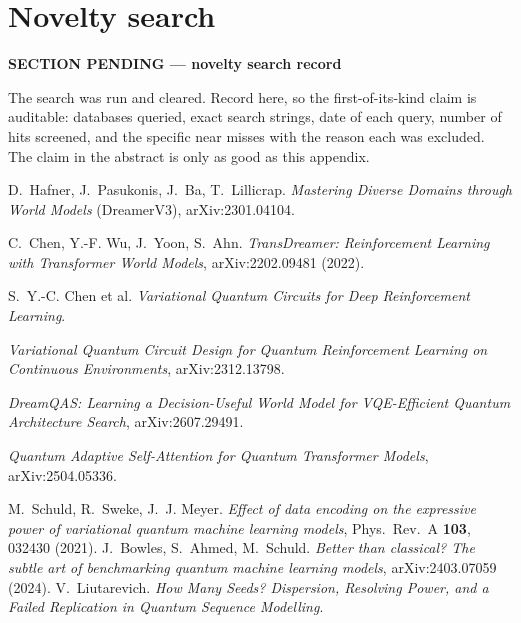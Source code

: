 \documentclass[11pt]{article}
\newif\ifdraft
\newcommand{\pend}[1]{%
  \ifdraft\textcolor{PendFG}{\textbf{[TODO:} \textit{#1}\textbf{]}}\fi}
\newenvironment{pendingbox}[1]
  {\par\vspace{3pt}\noindent
   \begin{lrbox}{\pendbox}\begin{minipage}{0.93\linewidth}\small
   \textcolor{PendFG}{\textbf{SECTION PENDING --- #1}}\par\vspace{3pt}
   \color{PendFG}}
  {\end{minipage}\end{lrbox}%
   \ifdraft\fcolorbox{PendFG}{PendBG}{\usebox{\pendbox}}\fi
   \par\vspace{4pt}}
\begin{document}
\section{Novelty search}\label{app:novelty}
\begin{pendingbox}{novelty search record}
The search was run and cleared. Record here, so the first-of-its-kind
claim is auditable: databases queried, exact search strings, date of
each query, number of hits screened, and the specific near misses with
the reason each was excluded. The claim in the abstract is only as good
as this appendix.
\end{pendingbox}


\begin{thebibliography}{9}
 D.~Hafner, J.~Pasukonis, J.~Ba, T.~Lillicrap.
  \emph{Mastering Diverse Domains through World Models} (DreamerV3),
  arXiv:2301.04104. \pend{confirm venue and year of record}
 C.~Chen, Y.-F. Wu, J.~Yoon, S.~Ahn.
  \emph{TransDreamer: Reinforcement Learning with Transformer World
  Models}, arXiv:2202.09481 (2022). \pend{verify author list}
 S.~Y.-C. Chen et al. \emph{Variational Quantum
  Circuits for Deep Reinforcement Learning}. \pend{full citation}
 \emph{Variational Quantum Circuit Design for
  Quantum Reinforcement Learning on Continuous Environments},
  arXiv:2312.13798. \pend{verify authors}
 \emph{DreamQAS: Learning a Decision-Useful World
  Model for VQE-Efficient Quantum Architecture Search},
  arXiv:2607.29491. \pend{verify authors}
 \emph{Quantum Adaptive Self-Attention for Quantum
  Transformer Models}, arXiv:2504.05336. \pend{verify authors; cite the
  revised version, which attributes its reported gain to a low-rank
  bottleneck rather than to quantumness}
 M.~Schuld, R.~Sweke, J.~J. Meyer. \emph{Effect of
  data encoding on the expressive power of variational quantum machine
  learning models}, Phys.\ Rev.\ A \textbf{103}, 032430 (2021).
 J.~Bowles, S.~Ahmed, M.~Schuld. \emph{Better than
  classical? The subtle art of benchmarking quantum machine learning
  models}, arXiv:2403.07059 (2024).
 V.~Liutarevich. \emph{How Many Seeds? Dispersion,
  Resolving Power, and a Failed Replication in Quantum Sequence
  Modelling}. \pend{companion paper; cite as submitted or as preprint}
\end{thebibliography}
\end{document}
